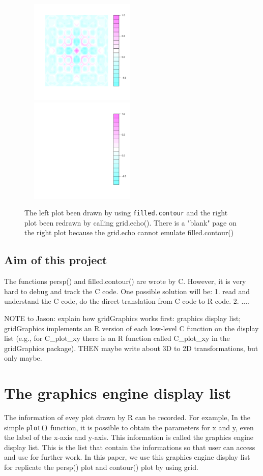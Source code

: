 \documentclass[a4paper,10pt]{article}\usepackage[]{graphicx}\usepackage[]{color}
\begin{document}
\begin{figure}[h]
\begin{center}
  \includegraphics[height = 5cm, width = 6cm]{figure/filled-contour.pdf}
  \includegraphics[height = 5cm, width = 6cm]{figure/filled-contour-gridecho.pdf}
  \caption{The left plot been drawn by using \texttt{filled.contour} and the right plot been redrawn by calling grid.echo(). There is a "blank" page on the right plot because the grid.echo cannot emulate filled.contour()}
  	\label{figure4}
\end{center}
\end{figure}

\subsection{Aim of this project}
The functions persp() and filled.contour() are wrote by C. However, it is very hard to debug and track the C code. One possible solution will be: 
1. read and understand the C code, do the direct translation from C code to R code.
2. ....


NOTE to Jason: explain how gridGraphics works first: graphics display list; gridGraphics implements an R version of each low-level C function on the display list (e.g., for C\_plot\_xy there is an R function called C\_plot\_xy in the gridGraphics package). THEN maybe write about 3D to 2D transformations, but only maybe.


\section{The graphics engine display list}
The information of evey plot drawn by R can be recorded. For example, In the simple \texttt{plot()} function, it is possible to obtain the parameters for x and y, even the label of the x-axis and y-axis.
This information is called the graphics engine display list. This is the list that contain the informations so that user can access and use for further work. In this paper, we use this graphics engine display list for replicate the persp() plot and contour() plot by using grid.
\end{document}
